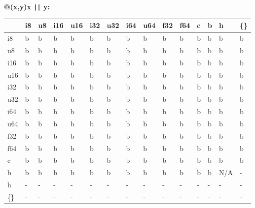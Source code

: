 \newpage
\textbf{@(x,y)x {\tt ||} y:}
\begin{scriptsize}\begin{tt}\begin{center}\vspace{-.3cm}\begin{tabular}{|m{.65cm}||m{.65cm}|m{.65cm}|m{.65cm}|m{.65cm}|m{.65cm}|m{.65cm}|m{.65cm}|m{.65cm}|m{.65cm}|m{.65cm}|m{.65cm}|m{.65cm}|m{.65cm}|m{.65cm}|}\hline 
&i8&u8&i16&u16&i32&u32&i64&u64&f32&f64&c&b&h&\{\}\\ \hline \hline
i8&b&b&b&b&b&b&b&b&b&b&b&b&b&b\\ \hline
u8&b&b&b&b&b&b&b&b&b&b&b&b&b&b\\ \hline
i16&b&b&b&b&b&b&b&b&b&b&b&b&b&b\\ \hline
u16&b&b&b&b&b&b&b&b&b&b&b&b&b&b\\ \hline
i32&b&b&b&b&b&b&b&b&b&b&b&b&b&b\\ \hline
u32&b&b&b&b&b&b&b&b&b&b&b&b&b&b\\ \hline
i64&b&b&b&b&b&b&b&b&b&b&b&b&b&b\\ \hline
u64&b&b&b&b&b&b&b&b&b&b&b&b&b&b\\ \hline
f32&b&b&b&b&b&b&b&b&b&b&b&b&b&b\\ \hline
f64&b&b&b&b&b&b&b&b&b&b&b&b&b&b\\ \hline
c&b&b&b&b&b&b&b&b&b&b&b&b&b&b\\ \hline
b&b&b&b&b&b&b&b&b&b&b&b&b&N/A&-\\ \hline
h&-&-&-&-&-&-&-&-&-&-&-&-&-&-\\ \hline
\{\}&-&-&-&-&-&-&-&-&-&-&-&-&-&-\\ \hline
\end{tabular}\end{center}\end{tt}\end{scriptsize} 

